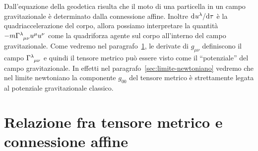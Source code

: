 Dall'equazione della geodetica risulta che il moto di una particella in un campo
gravitazionale è determinato dalla connessione affine.  Inoltre
$\mathrm{d}^{}u^{\lambda} / \mathrm{d} {\tau}^{}$ è la quadriaccelerazione del corpo, allora possiamo
interpretare la quantità
$-m\tensor{\Gamma}{^{\lambda}_{\mu\nu}} u^{\mu} u^{\nu}$ come la quadriforza
agente sul corpo all'interno del campo gravitazionale.  Come vedremo nel
paragrafo~\ref{sec:relazione-g-Gamma}, le derivate di $g_{\mu\nu}$ definiscono
il campo $\tensor{\Gamma}{^{\lambda}_{\mu\nu}}$ e quindi il tensore metrico può
essere visto come il ``potenziale'' del campo gravitazionale.  In effetti nel
paragrafo~\ref{sec:limite-newtoniano} vedremo che nel limite newtoniano la
componente $g_{00}$ del tensore metrico è strettamente legata al potenziale
gravitazionale classico.

\section{Relazione fra tensore metrico e connessione affine}
\label{sec:relazione-g-Gamma}

